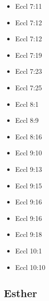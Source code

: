 \documentclass[14pt]{article}
\begin{document}
\begin{multicols}{2}
\begin{itemize}
					\item Eccl 7:11
					
					\item Eccl 7:12
					
					\item Eccl 7:12
					
					\item Eccl 7:19
					
					\item Eccl 7:23
					
					\item Eccl 7:25
					
					\item Eccl 8:1
					
					\item Eccl 8:9
					
					\item Eccl 8:16
					
					\item Eccl 9:10
					
					\item Eccl 9:13
					
					\item Eccl 9:15
					
					\item Eccl 9:16
					
					\item Eccl 9:16
					
					\item Eccl 9:18
					
					\item Eccl 10:1
					
					\item Eccl 10:10
					
\end{itemize}\end{multicols}

\subsection{Esther}
\end{document}
